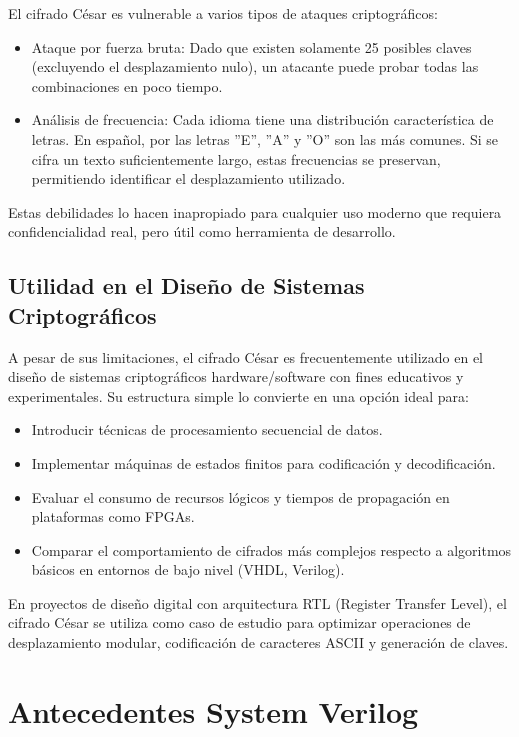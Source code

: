 El cifrado César es vulnerable a varios tipos de ataques criptográficos:

\begin{itemize}
\item Ataque por fuerza bruta: Dado que existen solamente 25 posibles claves (excluyendo el desplazamiento nulo), un atacante puede probar todas las combinaciones en poco tiempo.
\item Análisis de frecuencia: Cada idioma tiene una distribución característica de letras. En español, por   las letras ''E'', ''A'' y ''O'' son las más comunes. Si se cifra un texto suficientemente largo, estas frecuencias se preservan, permitiendo identificar el desplazamiento utilizado.
\end{itemize}

Estas debilidades lo hacen inapropiado para cualquier uso moderno que requiera confidencialidad real, pero útil como herramienta de desarrollo.

\section{Utilidad en el Diseño de Sistemas Criptográficos}
A pesar de sus limitaciones, el cifrado César es frecuentemente utilizado en el diseño de sistemas criptográficos hardware/software con fines educativos y experimentales. Su estructura simple lo convierte en una opción ideal para:

\begin{itemize}
\item Introducir técnicas de procesamiento secuencial de datos.
\item Implementar máquinas de estados finitos para codificación y decodificación.
\item Evaluar el consumo de recursos lógicos y tiempos de propagación en plataformas como FPGAs.
\item Comparar el comportamiento de cifrados más complejos respecto a algoritmos básicos en entornos de bajo nivel (VHDL, Verilog).
\end{itemize}

En proyectos de diseño digital con arquitectura RTL (Register Transfer Level), el cifrado César se utiliza como caso de estudio para optimizar operaciones de desplazamiento modular, codificación de caracteres ASCII y generación de claves.



\chapter{Antecedentes System Verilog}

